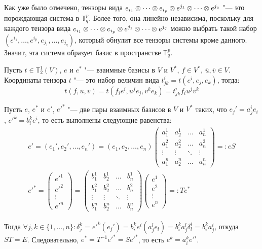 \begin{note}
	Как уже было отмечено, тензоры вида $e_{i_1} \otimes \dots \otimes e_{i_p} \otimes e^{j_1} \hm{\otimes} \dots \otimes e^{j_q}$ "--- это порождающая система в $\mathbb T^p_q$. Более того, она линейно независима, поскольку для каждого тензора вида $e_{i_1} \otimes \dots \otimes e_{i_p} \otimes e^{j_1} \hm{\otimes} \dots \otimes e^{j_q}$ можно выбрать такой набор $(e^{i_1}, \dots, e^{i_p}, e_{j_1}, \dots, e_{j_q})$, который обнулит все тензоры системы кроме данного. Значит, эта система образует базис в пространстве $\mathbb{T}^p_q$.
\end{note}

\begin{example}
	Пусть $t \in \mathbb{T}^1_2(V)$, $e$ и $e^*$ "--- взаимные базисы в $V$ и $V^*$, $f \in V^*$, $\overline{u}, \overline{v} \in V$. Координаты тензора $t$ "--- это набор величин вида $t^i_{jk} = t(e^i, e_j, e_k)$, тогда:
	\[t(f, \overline{u}, \overline{v}) = t(f_ie^i, u^je_j, v^ke_k) = t^i_{jk}f_iu^jv^k\]
\end{example}

\begin{example}
	Пусть $e$, $e^*$ и $e'$, $e'^*$ "--- две пары взаимных базисов в $V$ и $V^*$ таких, что $e_j' = a_j^ie_i$, $e'^k = b_i^ke^i$, то есть выполнены следующие равенства:
	\begin{gather*}
	e' = (e_1', e_2', \dots, e_n') = (e_1, e_2, \dots, e_n)\begin{pmatrix}
		a_1^1 & a_2^1 & \dots & a_n^1\\
		a_1^2 & a_2^2 & \dots & a_n^2\\
		\vdots & \vdots & \ddots & \vdots\\
		a_1^n & a_2^n & \dots & a_n^n
	\end{pmatrix} =: eS
	\\
	e'^* = \begin{pmatrix}e'^1\\e'^2\\\vdots\\e'^n\end{pmatrix} = \begin{pmatrix}
		b_1^1 & b_2^1 & \dots & b_n^1\\
		b_1^2 & b_2^2 & \dots & b_n^2\\
		\vdots & \vdots & \ddots & \vdots\\
		b_1^n & b_2^n & \dots & b_n^n
	\end{pmatrix}\begin{pmatrix}e^1\\e^2\\\vdots\\e^n\end{pmatrix} =: Te^*
	\end{gather*}
	
	Тогда $\forall j, k \in \{1, \dotsc, n\}: \delta^k_j = e'^k(e_j') = b_i^ke^i(a_j^le_l) = b^k_ia^l_j\delta^i_l = b_i^ka^i_j$, откуда $ST = E$. Следовательно, $e^* = T^{-1}e'^* = Se'^*$, то есть $e^k = a^k_ie'^i$.
\end{example}

